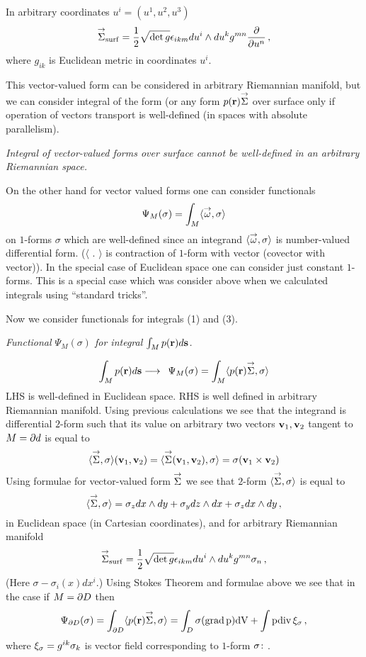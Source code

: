 In arbitrary coordinates $u^i=(u^1,u^2,u^3)$
          $$
\Sv_{\rm surf}={1\over 2}\sqrt{\det g}\epsilon_{ikm}du^i\wedge du^k g^{mn}
                 {\p\over \p u^n}\,,
           $$
where $g_{ik}$ is Euclidean metric in coordinates $u^i$.

 This vector-valued form can be considered in arbitrary Riemannian manifold,
but we can consider integral of the form (or any form $p(\r)\Sv$
 over surface only if operation of vectors transport is well-defined
(in spaces with absolute parallelism).

{\it Integral of vector-valued forms over surface cannot be well-defined
in an arbitrary Riemannian space.}

On the other hand for vector valued forms one can consider functionals
     $$
 \Psi_M(\sigma)=\int_M\langle\wv,\s\rangle
     $$
on $1$-forms $\sigma$ which are well-defined since an
integrand $\langle\wv,\sigma\rangle$
is number-valued differential form.
($\langle\,\,.\,\,\rangle$ is contraction of $1$-form 
with vector (covector with vector)).
  In the special case of Euclidean space one can consider 
just constant $1$-forms.  This is a special case which was consider
above when we calculated integrals using ``standard tricks''.

Now we consider  functionals for integrals (1) and (3).
 
\m

\centerline 
{\sl Functional $\Psi_M(\sigma)$ for integral $\int_M p({\bf r})d{\bf s }$.}

\smallskip


      $$\int_M p(\r)d\ss\longrightarrow\,\,\,
 \Psi_{M}(\s)=\int_{M} \langle p(\r)\Sv,\s\rangle
         $$
LHS is well-defined in Euclidean space. RHS is well defined 
in arbitrary Riemannian manifold.
Using previous calculations  we see that the 
integrand is differential $2$-form such that its value on
arbitrary two vectors ${\bf v}_1,{\bf v}_2$ tangent to $M=\partial d$ is equal to
          $$
 \langle\Sv,\s\rangle(\v_1,\v_2)=\langle\Sv(\v_1,\v_2),\s\rangle=
       \s(\v_1\times\v_2)
$$
Using formulae for vector-valued form $\Sv$ 
we see that $2$-form $\langle\Sv,\s\rangle$ is equal to
              $$
\langle\Sv,\s\rangle=\sigma_z dx\wedge dy+
       \sigma_y dz\wedge dx+\sigma_z dx\wedge dy\,,
              $$
in Euclidean space (in Cartesian coordinates),
and for arbitrary Riemannian manifold
          $$
     \Sv_{\rm surf}=
{1\over 2}\sqrt{\det g}\epsilon_{ikm}du^i\wedge du^k g^{mn}\s_n\,,
           $$
(Here $\sigma-\sigma_i(x)dx^i$.)
Using Stokes Theorem and formulae above we see that
in the case if $M=\partial D$ then
   $$
\Psi_{\p D}(\sigma)=\int_{\p D}\langle p(\r)\Sv,\s\rangle=
\int_D\s(\grad p)dV+\int p\div \xi_\s\,,
   $$
where $\xi_{\sigma}=g^{ik}{\sigma}_k$ is vector 
field corresponding to $1$-form ${\sigma}\colon$.

